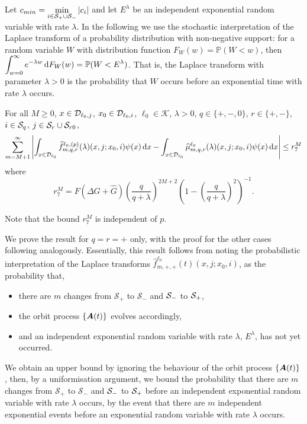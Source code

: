 Let \(c_{min} = \min\limits_{i\in\mathcal S_{+}\cup\mathcal{S}_-} |c_i|\) and let \(E^\lambda\) be an independent exponential random variable with rate \(\lambda\). In the following we use the stochastic interpretation of the Laplace transform of a probability distribution with non-negative support: for a random variable \(W\) with distribution function \(F_W(w)= \mathbb P(W<w)\), then \(\displaystyle\int_{w=0}^\infty e^{-\lambda w} \, \mathrm{d} F_W(w) = \mathbb P(W < E^{\lambda})\). That is, the Laplace transform with parameter \(\lambda >0\) is the probability that \(W\) occurs before an exponential time with rate \(\lambda\) occurs. 
\begin{lem}\label{lem: gkjljklgagjklagsjlk}For all \(M\geq 0\), \(x\in\mathcal{D}_{\ell_0,j}\), \(x_0\in\mathcal{D}_{\ell_0,i}\), \(\ell_0\in\mathcal K\), \(\lambda > 0\), \(q\in\{+,-,0\}\), \(r\in\{+,-\}\), \(i\in\mathcal{S}_q\), \(j\in\mathcal{S}_r\cup\mathcal{S}_{r0}\),
	\begin{align}
		\sum_{m=M+1}^\infty \left| \int_{x\in\mathcal{D}_{\ell_0}} \widehat f^{\ell_0,(p)}_{m,q,r}(\lambda)(x,j;x_0,i)\psi(x)\, \mathrm{d} x
		-
		\int_{x\in\mathcal{D}_{\ell_0}} \widehat \mu^{\ell_0}_{m,q,r}(\lambda)(x,j;x_0,i)\psi(x) \, \mathrm{d} x\right| \leq r_7^M
	\end{align}
	where 
	\[r_7^M =  F(\Delta G + \widehat G)\left(\frac{q}{q+\lambda}\right)^{2M+2} \left(1-\left(\frac{q}{q+\lambda}\right)^2\right)^{-1} .\]
\end{lem}
Note that the bound \(r_7^M\) is independent of \(p\). 

We prove the result for \(q=r=+\) only, with the proof for the other cases following analogously. Essentially, this result follows from noting the probabilistic interpretation of the Laplace transforms \(\widehat f^{\ell_0}_{m,+,+}(t)(x,j;x_0,i)\), as the probability that, 
\begin{itemize}
	\item there are \(m\) changes from \(\mathcal S_+\) to \(\mathcal S_-\) and \(\mathcal{S}_-\) to \(\mathcal{S}_+\), 
	\item the orbit process \(\{\boldsymbol A(t)\}\) evolves accordingly, 
	\item and an independent exponential random variable with rate \(\lambda\), \(E^\lambda\), has not yet occurred.
\end{itemize}
We obtain an upper bound by ignoring the behaviour of the orbit process \(\{\boldsymbol A(t)\}\), then, by a uniformisation argument, we bound the probability that there are \(m\) changes from \(\mathcal S_+\) to \(\mathcal S_-\) and \(\mathcal{S}_-\) to \(\mathcal{S}_+\) before an independent exponential random variable with rate \(\lambda\) occurs, by the event that there are \(m\) independent exponential events before an exponential random variable with rate \(\lambda\) occurs.

